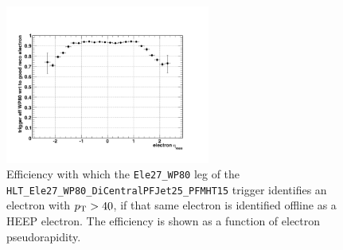 \begin{figure}
  \centering
  \includegraphics[width=0.60\textwidth]{tex/analysis/event_selection/fig/trigger/wp80_eta.png}
  \caption{
    Efficiency with which the \texttt{Ele27\_WP80} leg of the \texttt{HLT\_Ele27\_WP80\_DiCentralPFJet25\_PFMHT15}
    trigger identifies an electron with $p_{\text{T}} > 40$, if that same electron is identified offline as a HEEP electron.
    The efficiency is shown as a function of electron pseudorapidity.
  }
  \label{fig:wp80}
\end{figure}

